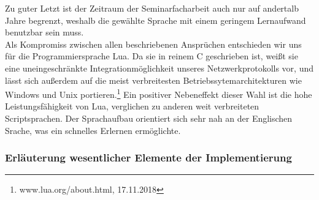 \documentclass[12pt, a4paper]{scrartcl}
\begin{document}
Zu guter Letzt ist der Zeitraum der Seminarfacharbeit auch nur auf andertalb Jahre begrenzt, weshalb die gewählte Sprache mit einem geringem Lernaufwand benutzbar sein muss.\\
Als Kompromiss zwischen allen beschriebenen Ansprüchen entschieden wir uns für die Programmiersprache Lua. Da sie in reinem C geschrieben ist, weißt sie eine uneingeschränkte Integrationmöglichkeit unseres Netzwerkprotokolls vor, und lässt sich außerdem auf die meist verbreitesten Betriebssytemarchitekturen wie Windows und Unix portieren.\footnote{www.lua.org/about.html, 17.11.2018} Ein positiver Nebeneffekt dieser Wahl ist die hohe Leistungsfähigkeit von Lua, verglichen zu anderen weit verbreiteten Scriptsprachen. Der Sprachaufbau orientiert sich sehr nah an der Englischen Srache, was ein schnelles Erlernen ermöglichte. 


\subsubsection{Erläuterung wesentlicher Elemente der Implementierung}
\newpage
\end{document}
